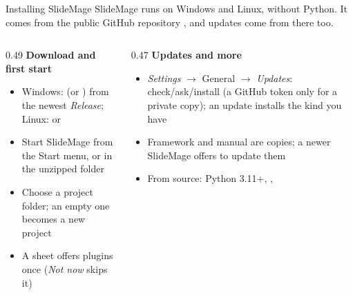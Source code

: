 

\begin{standardframe}{Installing SlideMage}
	\small
	SlideMage runs on Windows and Linux, without Python. It comes from the public
	GitHub repository , and updates come from there too.
	\par
	\begin{columns}[T,onlytextwidth]
		\begin{column}{0.49\linewidth}
			\textbf{Download and first start}
			\begin{itemize}
				\item Windows:  (or ) from the newest \emph{Release}; Linux:  or 
				\item Start SlideMage from the Start menu, or  in the unzipped folder
				\item Choose a project folder; an empty one becomes a new project
				\item A sheet offers plugins once (\emph{Not now} skips it)
			\end{itemize}
		\end{column}
		\begin{column}{0.47\linewidth}
			\textbf{Updates and more}
			\begin{itemize}
				\item \emph{Settings} $\rightarrow$ General $\rightarrow$ \emph{Updates}: check/ask/install (a GitHub token only for a private copy); an update installs the kind you have
				\item Framework and manual are copies; a newer SlideMage offers to update them
				\item From source: Python 3.11+, , 
			\end{itemize}
		\end{column}
	\end{columns}
\end{standardframe}
